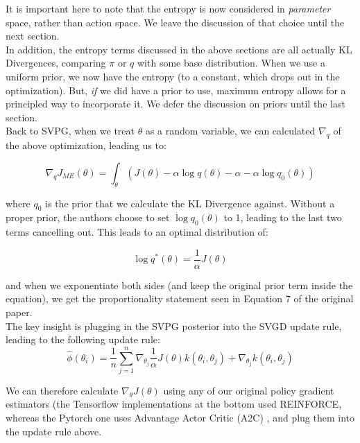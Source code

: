 \documentclass[12pt]{article}
\begin{document}
\noindent It is important here to note that the entropy is now considered in \textit{parameter} space, rather than action space. We leave the discussion of that choice until the next section.\\

\noindent In addition, the entropy terms discussed in the above sections are all actually KL Divergences, comparing $\pi$ or $q$ with some base distribution. When we use a uniform prior, we now have the entropy (to a constant, which drops out in the optimization). But, \textit{if} we did have a prior to use, maximum entropy allows for a principled way to incorporate it. We defer the discussion on priors until the last section. \\

\noindent Back to SVPG, when we treat $\theta$ as a random variable, we can calculated $\nabla_q$ of the above optimization, leading us to:

\begin{equation}
    \nabla_q J_{ME}(\theta) = \int_{\theta} (J(\theta) - \alpha \log q(\theta) - \alpha - \alpha \log q_0(\theta))
\end{equation}

\noindent where $q_0$ is the prior that we calculate the KL Divergence against. Without a proper prior, the authors choose to set $\log q_0(\theta)$ to 1, leading to the last two terms cancelling out. This leads to an optimal distribution of:

\begin{equation}
    \log q^*(\theta) = \frac{1}{\alpha} J(\theta)
\end{equation}

\noindent and when we exponentiate both sides (and keep the original prior term inside the equation), we get the proportionality statement seen in Equation 7 of the original paper. \\

\noindent The key insight is plugging in the SVPG posterior into the SVGD update rule, leading to the following update rule:\\

\begin{equation}
    \hat \phi (\theta_i) = \frac{1}{n} \sum_{j=1}^n \nabla_{\theta_j} \frac{1}{\alpha}J(\theta)k(\theta_i, \theta_j) + \nabla_{\theta_j} k(\theta_i, \theta_j) 
\end{equation}

\noindent We can therefore calculate $\nabla_\theta J(\theta)$ using any of our original policy gradient estimators (the Tensorflow implementations at the bottom used REINFORCE, whereas the Pytorch one uses Advantage Actor Critic (A2C) \cite{mnih2016asynchronous}, and plug them into the update rule above. \\
\end{document}

